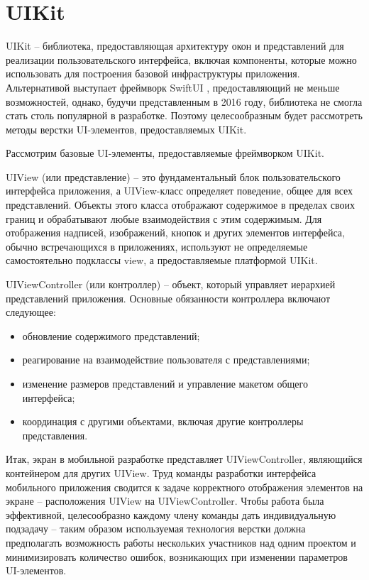 \section{UIKit}

UIKit \cite{uikit} -- библиотека, предоставляющая архитектуру окон и представлений для реализации пользовательского интерфейса, включая компоненты, которые можно использовать для построения базовой инфраструктуры приложения. Альтернативой выступает фреймворк SwiftUI \cite{swiftui}, предоставляющий не меньше возможностей, однако, будучи представленным в 2016 году, библиотека не смогла стать столь популярной в разработке. Поэтому целесообразным будет рассмотреть методы верстки UI-элементов, предоставляемых UIKit.


Рассмотрим базовые UI-элементы, предоставляемые фреймворком UIKit.

UIView (или представление) \cite{uiview} -- это фундаментальный блок пользовательского интерфейса приложения, а UIView-класс определяет поведение, общее для всех представлений. Объекты этого класса отображают содержимое в пределах своих границ и обрабатывают любые взаимодействия с этим содержимым. Для отображения надписей, изображений, кнопок и других элементов интерфейса, обычно встречающихся в приложениях, используют не определяемые самостоятельно подклассы view, а предоставляемые платформой UIKit. 

UIViewController (или контроллер) \cite{controller} -- объект, который управляет иерархией представлений приложения. Основные обязанности контроллера включают следующее:

\begin{itemize}
	\item обновление содержимого представлений;
	\item реагирование на взаимодействие пользователя с представлениями;
	\item изменение размеров представлений и управление макетом общего интерфейса;
	\item координация с другими объектами, включая другие контроллеры представления.
\end{itemize}

Итак, экран в мобильной разработке представляет UIViewController, являющийся контейнером для других UIView. Труд команды разработки интерфейса мобильного приложения сводится к задаче корректного отображения элементов на экране -- расположения UIView на UIViewController. Чтобы работа была эффективной, целесообразно каждому члену команды дать индивидуальную подзадачу -- таким образом используемая технология верстки должна предполагать возможность работы нескольких участников над одним проектом и минимизировать количество ошибок, возникающих при изменении параметров UI-элементов. 

